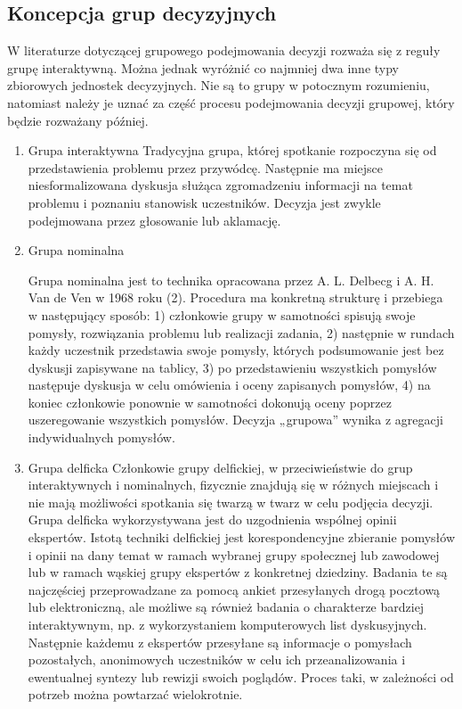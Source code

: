 \subsection{Koncepcja grup decyzyjnych}
W literaturze dotyczącej grupowego podejmowania decyzji rozważa się z reguły grupę 
interaktywną. Można jednak wyróżnić co najmniej dwa inne typy zbiorowych jednostek decyzyjnych. 
Nie są to grupy w potocznym rozumieniu, natomiast należy je uznać za część procesu podejmowania 
decyzji grupowej, który będzie rozważany później.
\begin{enumerate}[1)]
  \item Grupa interaktywna
  Tradycyjna grupa, której spotkanie rozpoczyna się od przedstawienia problemu przez 
  przywódcę. Następnie ma miejsce niesformalizowana dyskusja służąca zgromadzeniu 
  informacji na temat problemu i poznaniu stanowisk uczestników. Decyzja jest zwykle 
  podejmowana przez głosowanie lub aklamację.

  \item Grupa nominalna
  
  Grupa nominalna jest to technika opracowana przez A. L. Delbecg i A. H. Van de Ven w 1968 roku (2). 
  Procedura ma konkretną strukturę i przebiega w następujący sposób: 1) członkowie grupy w samotności 
  spisują swoje pomysły, rozwiązania problemu lub realizacji zadania, 2) następnie w rundach 
  każdy uczestnik przedstawia swoje pomysły, których podsumowanie jest bez dyskusji zapisywane 
  na tablicy, 3) po przedstawieniu wszystkich pomysłów następuje dyskusja w celu omówienia i oceny 
  zapisanych pomysłów, 4) na koniec członkowie ponownie w samotności dokonują oceny 
  poprzez uszeregowanie wszystkich pomysłów. Decyzja „grupowa” wynika z agregacji indywidualnych pomysłów.

  \item Grupa delficka
  Członkowie grupy delfickiej, w przeciwieństwie do grup
  interaktywnych i nominalnych, fizycznie znajdują się w różnych miejscach i
  nie mają możliwości spotkania się twarzą w twarz w celu podjęcia decyzji.
  Grupa delficka wykorzystywana jest do uzgodnienia wspólnej opinii ekspertów. 
  Istotą techniki delfickiej jest korespondencyjne zbieranie pomysłów i opinii 
  na dany temat w ramach wybranej grupy społecznej lub zawodowej lub w ramach 
  wąskiej grupy ekspertów z konkretnej dziedziny. Badania te są najczęściej 
  przeprowadzane za pomocą ankiet przesyłanych drogą pocztową lub elektroniczną,
  ale możliwe są również badania o charakterze bardziej interaktywnym, np.
  z wykorzystaniem  komputerowych list dyskusyjnych. Następnie każdemu z
  ekspertów przesyłane są informacje o pomysłach pozostałych, anonimowych 
  uczestników w celu ich przeanalizowania i ewentualnej syntezy lub rewizji 
  swoich poglądów. Proces taki, w zależności od potrzeb można powtarzać 
  wielokrotnie.

\end{enumerate}


